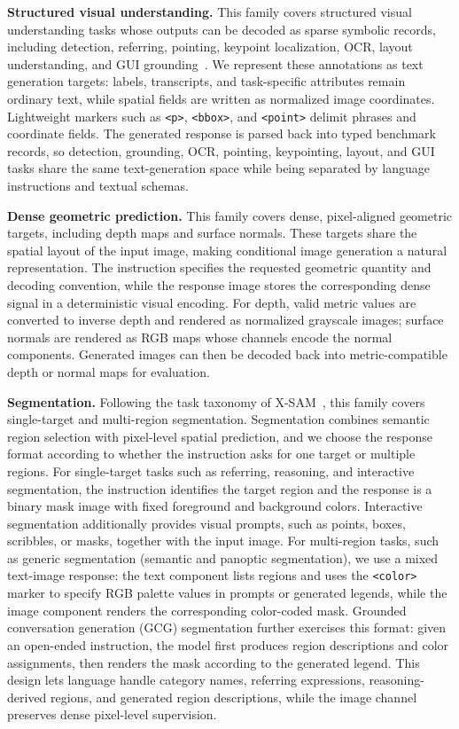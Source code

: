 \textbf{Structured visual understanding.}
This family covers structured visual understanding tasks whose outputs can be decoded as sparse symbolic records, including detection, referring, pointing, keypoint localization, OCR, layout understanding, and GUI grounding~\cite{rexomni}.
We represent these annotations as text generation targets: labels, transcripts, and task-specific attributes remain ordinary text, while spatial fields are written as normalized image coordinates.
Lightweight markers such as \texttt{<p>}, \texttt{<bbox>}, and \texttt{<point>} delimit phrases and coordinate fields.
The generated response is parsed back into typed benchmark records, so detection, grounding, OCR, pointing, keypointing, layout, and GUI tasks share the same text-generation space while being separated by language instructions and textual schemas.

\textbf{Dense geometric prediction.}
This family covers dense, pixel-aligned geometric targets, including depth maps and surface normals.
These targets share the spatial layout of the input image, making conditional image generation a natural representation.
The instruction specifies the requested geometric quantity and decoding convention, while the response image stores the corresponding dense signal in a deterministic visual encoding.
For depth, valid metric values are converted to inverse depth and rendered as normalized grayscale images; surface normals are rendered as RGB maps whose channels encode the normal components.
Generated images can then be decoded back into metric-compatible depth or normal maps for evaluation.

\textbf{Segmentation.}
Following the task taxonomy of X-SAM~\cite{xsam}, this family covers single-target and multi-region segmentation.
Segmentation combines semantic region selection with pixel-level spatial prediction, and we choose the response format according to whether the instruction asks for one target or multiple regions.
For single-target tasks such as referring, reasoning, and interactive segmentation, the instruction identifies the target region and the response is a binary mask image with fixed foreground and background colors.
Interactive segmentation additionally provides visual prompts, such as points, boxes, scribbles, or masks, together with the input image.
For multi-region tasks, such as generic segmentation (semantic and panoptic segmentation), we use a mixed text-image response: the text component lists regions and uses the \texttt{<color>} marker to specify RGB palette values in prompts or generated legends, while the image component renders the corresponding color-coded mask.
Grounded conversation generation (GCG) segmentation further exercises this format: given an open-ended instruction, the model first produces region descriptions and color assignments, then renders the mask according to the generated legend.
This design lets language handle category names, referring expressions, reasoning-derived regions, and generated region descriptions, while the image channel preserves dense pixel-level supervision.

